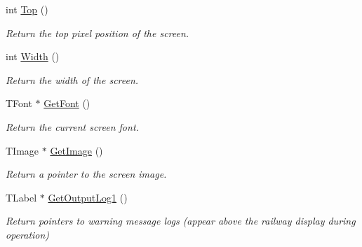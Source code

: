 \begin{DoxyCompactItemize}
\mbox{\label{class_t_display_a7c843ab3083d7851ed199251d317f50a}} 
int \mbox{\hyperlink{class_t_display_a7c843ab3083d7851ed199251d317f50a}{Top}} ()
\begin{DoxyCompactList}\small\item\em Return the top pixel position of the screen. \end{DoxyCompactList}\item 
\mbox{\label{class_t_display_a39cee11613d156de0d1f5df923a02c8d}} 
int \mbox{\hyperlink{class_t_display_a39cee11613d156de0d1f5df923a02c8d}{Width}} ()
\begin{DoxyCompactList}\small\item\em Return the width of the screen. \end{DoxyCompactList}\item 
\mbox{\label{class_t_display_a375ba345403e91af04392540fbd5f2f3}} 
T\+Font $\ast$ \mbox{\hyperlink{class_t_display_a375ba345403e91af04392540fbd5f2f3}{Get\+Font}} ()
\begin{DoxyCompactList}\small\item\em Return the current screen font. \end{DoxyCompactList}\item 
\mbox{\label{class_t_display_a33f7067eea9e638bdc363bd0af70d7d5}} 
T\+Image $\ast$ \mbox{\hyperlink{class_t_display_a33f7067eea9e638bdc363bd0af70d7d5}{Get\+Image}} ()
\begin{DoxyCompactList}\small\item\em Return a pointer to the screen image. \end{DoxyCompactList}\item 
\mbox{\label{class_t_display_abaab175c40149d2a4c449e9463b21a42}} 
T\+Label $\ast$ \mbox{\hyperlink{class_t_display_abaab175c40149d2a4c449e9463b21a42}{Get\+Output\+Log1}} ()
\begin{DoxyCompactList}\small\item\em Return pointers to warning message logs (appear above the railway display during operation) \end{DoxyCompactList}\item 
\mbox{\label{class_t_display_a913b1be885ac6fc291bf8367e0a8f6f0}} 

\end{DoxyCompactItemize}
